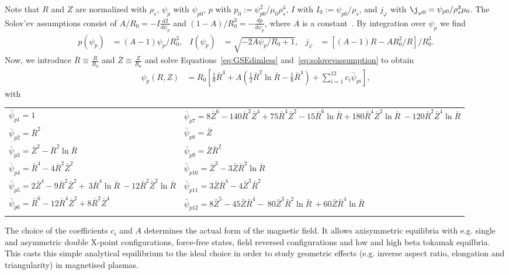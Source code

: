Note that $R$ and $Z$ are normalized
with $\rho_s$, $\psi_p$ with $\psi_{p0}$, $p$ with
$p_0 := \psi_{p0}^2/\mu_0\rho_s^4$, $I$ with $I_0:=\psi_{p0}/\rho_s$,
and $j_\varphi$ with $\j_{\varphi 0} = \psi_{p0}/\rho_s^3\mu_0$.
The Solov'ev assumptions consist of \(A/R_0 = -I \frac{d I}{d  \psi_p }\) and \((1-A)/R_0^3 = -\frac{d p}{d  \psi_p }\), where \(A\) is a constant~\cite{Cerfon2010,Cerfon2014}.
By integration over \(\psi_p\) we find
\begin{align}\label{eq:solovevassumption}
 p(\psi_p) &= (A-1)\psi_p/R_0^3,  &
 I(\psi_p) &= \sqrt{-2 A \psi_p/R_0 + 1}, &
 j_\varphi &= \left[(A-1)R - A R_0^2 / R\right]/R_0^3.
\end{align}
Now, we introduce \(\bar{R} \equiv \frac{R}{R_0}\) and \(\bar{Z} \equiv\frac{Z}{R_0}\)
and solve Equations~\eqref{eq:GSEdimless} and~\eqref{eq:solovevassumption} to obtain
\begin{align}\label{eq:solovev}
 \psi_p (R,Z) &= R_0 \left[ \frac{1}{8}\bar{R}^4 + A\left( \frac{1}{2} \bar{R}^2 \ln{\bar{R}} 
   - \frac{1}{8}\bar{R}^4\right) + \sum_{i=1}^{12} c_{i}  \bar{\psi}_{pi}\right],
\end{align}
with
\begin{longtable}{>{\RaggedRight}p{7cm}>{\RaggedRight}p{7cm}}
\toprule
  $\bar{\psi}_{p1}=1$
  & $\bar{\psi}_{p7}=8\bar{Z}^6 -140 \bar{R}^2 \bar{Z}^4
                      + 75 \bar{R}^4 \bar{Z}^2 - 15\bar{R}^6\ln{\bar{R}}+ 180 \bar{R}^4 \bar{Z}^2 \ln{\bar{R}} \
                       -120 \bar{R}^2 \bar{Z}^4 \ln{\bar{R}}$\\
%
  $\bar{\psi}_{p2}=\bar{R}^2$ &
  $\bar{\psi}_{p8}=\bar{Z}$ \\
%
  $\bar{\psi}_{p3}=\bar{Z}^2 - \bar{R}^2 \ln{\bar{R}}$ &
  $\bar{\psi}_{p9}=\bar{Z}  \bar{R}^2$\\
%
  $\bar{\psi}_{p4}=\bar{R}^4 -4\bar{R}^2\bar{Z}^2$ &
  $\bar{\psi}_{p10}=\bar{Z}^3 - 3 \bar{Z} \bar{R}^2 \ln{\bar{R}}$\\
  $\bar{\psi}_{p5}=2\bar{Z}^4 - 9 \bar{R}^2\bar{Z}^2 + \
                     3 \bar{R}^4 \ln{\bar{R}} \
                    -12  \bar{R}^2\bar{Z}^2 \ln{\bar{R}}$
  &
$\bar{\psi}_{p11}=3 \bar{Z}\bar{R}^4 - 4\bar{Z}^3\bar{R}^2$\\
%
  $\bar{\psi}_{p6}=\bar{R}^6 -12 \bar{R}^4 \bar{Z}^2
                     + 8  \bar{R}^2 \bar{Z}^4$ &
  $\bar{\psi}_{p12}= 8 \bar{Z}^5 -45 \bar{Z} \bar{R}^4 - \
                       80 \bar{Z}^3 \bar{R}^2\ln{\bar{R}} \
                       +60 \bar{Z} \bar{R}^4\ln{\bar{R}}$ \\
   & \\
\bottomrule
\end{longtable}
The choice of the coefficients \(c_{i}\) and \(A\) determines the actual form of the magnetic field. It allows axisymmetric equilibria with e.g. single and asymmetric double X-point configurations, force-free states,
field reversed configurations and low and high beta tokamak equilbria. This casts this simple analytical equilibrium to the ideal choice in order to study geometric effects (e.g. inverse aspect ratio, elongation and triangularity) in magnetised plasmas.

